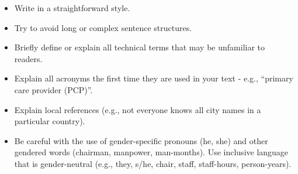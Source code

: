 \documentclass{icis}
\begin{document}
\begin{itemize}
\item Write in a straightforward style.
\item Try to avoid long or complex sentence structures.
\item Briefly define or explain all technical terms that may be unfamiliar to
  readers.
\item Explain all acronyms the first time they are used in your text - e.g.,
  ``primary care provider (PCP)''.
\item Explain local references (e.g., not everyone knows all city names in a
  particular country).
\item Be careful with the use of gender-specific pronouns (he, she) and other
  gendered words (chairman, manpower, man-months). Use inclusive language that
  is gender-neutral (e.g., they, s/he, chair, staff, staff-hours, person-years).
\end{itemize}

% 
% 

\printbibliography
\end{document}
